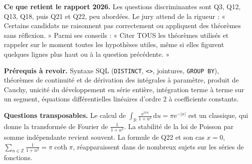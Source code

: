 \documentclass[11pt,a4paper]{article}
\begin{document}
\textbf{Ce que retient le rapport 2026.} Les questions discriminantes sont Q3, Q12, Q13, Q18, puis Q21 et Q22, peu abordées. Le jury attend de la rigueur : « Certains candidats ne raisonnent pas correctement ou appliquent des théorèmes sans réflexion. » Parmi ses conseils : « Citer TOUS les théorèmes utilisés et rappeler sur le moment toutes les hypothèses utiles, même si elles figurent quelques lignes plus haut ou à la question précédente. »

\textbf{Prérequis à revoir.} Syntaxe SQL (\texttt{DISTINCT}, \texttt{\textless{}\textgreater{}}, jointures, \texttt{GROUP\ BY}), théorèmes de continuité et de dérivation des intégrales à paramètre, produit de Cauchy, unicité du développement en série entière, intégration terme à terme sur un segment, équations différentielles linéaires d'ordre 2 à coefficients constants.

\textbf{Questions transposables.} Le calcul de \(\int_{\mathbb{R}}\frac{{\mathrm{e}}^{\mathrm{i}xu}}{1+u^2}\,\mathrm{d}u=\pi{\mathrm{e}}^{-|x|}\) est un classique, qui donne la transformée de Fourier de \(\frac{1}{1+u^2}\). La stabilité de la loi de Poisson par somme indépendante revient souvent. La formule de Q22 et son cas \(x=0\), \(\sum_{n\in\mathbb{Z}}\frac{1}{1+n^2}=\pi\coth\pi\), réapparaissent dans de nombreux sujets sur les séries de fonctions.
\end{document}
